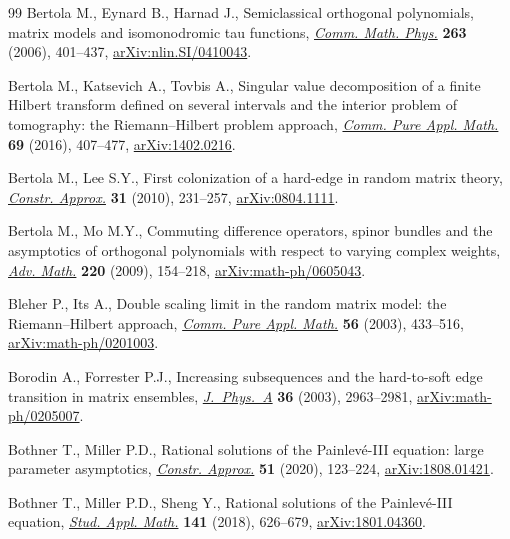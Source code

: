 \documentclass[10pt,a4paper]{amsart}
\numberwithin{equation}{section}
\theoremstyle{definition}
\begin{document}
\begin{thebibliography}{99}
Bertola M., Eynard B., Harnad J., Semiclassical orthogonal polynomials, matrix
 models and isomonodromic tau functions,
 \href{https://doi.org/10.1007/s00220-005-1505-4}{\textit{Comm. Math. Phys.}}
 \textbf{263} (2006), 401--437,
 \href{http://arxiv.org/abs/nlin.SI/0410043}{arXiv:nlin.SI/0410043}.

Bertola M., Katsevich A., Tovbis A., Singular value decomposition of a finite
 {H}ilbert transform defined on several intervals and the interior problem of
 tomography: the {R}iemann--{H}ilbert problem approach,
 \href{https://doi.org/10.1002/cpa.21547}{\textit{Comm. Pure Appl. Math.}}
 \textbf{69} (2016), 407--477,
 \href{http://arxiv.org/abs/1402.0216}{arXiv:1402.0216}.

Bertola M., Lee S.Y., First colonization of a hard-edge in random matrix
 theory, \href{https://doi.org/10.1007/s00365-009-9052-4}{\textit{Constr.
 Approx.}} \textbf{31} (2010), 231--257,
 \href{http://arxiv.org/abs/0804.1111}{arXiv:0804.1111}.

Bertola M., Mo M.Y., Commuting difference operators, spinor bundles and the
 asymptotics of orthogonal polynomials with respect to varying complex
 weights, \href{https://doi.org/10.1016/j.aim.2008.09.001}{\textit{Adv.
 Math.}} \textbf{220} (2009), 154--218,
 \href{http://arxiv.org/abs/math-ph/0605043}{arXiv:math-ph/0605043}.

Bleher P., Its A., Double scaling limit in the random matrix model: the
 {R}iemann--{H}ilbert approach,
 \href{https://doi.org/10.1002/cpa.10065}{\textit{Comm. Pure Appl. Math.}}
 \textbf{56} (2003), 433--516,
 \href{http://arxiv.org/abs/math-ph/0201003}{arXiv:math-ph/0201003}.

Borodin A., Forrester P.J., Increasing subsequences and the hard-to-soft edge
 transition in matrix ensembles,
 \href{https://doi.org/10.1088/0305-4470/36/12/307}{\textit{J.~Phys.~A}}
 \textbf{36} (2003), 2963--2981,
 \href{http://arxiv.org/abs/math-ph/0205007}{arXiv:math-ph/0205007}.

Bothner T., Miller P.D., Rational solutions of the {P}ainlev\'e-{III} equation:
 large parameter asymptotics,
 \href{https://doi.org/10.1007/s00365-019-09463-4}{\textit{Constr. Approx.}}
 \textbf{51} (2020), 123--224,
 \href{http://arxiv.org/abs/1808.01421}{arXiv:1808.01421}.

Bothner T., Miller P.D., Sheng Y., Rational solutions of the {P}ainlev\'e-{III}
 equation, \href{https://doi.org/10.1111/sapm.12220}{\textit{Stud. Appl.
 Math.}} \textbf{141} (2018), 626--679,
 \href{http://arxiv.org/abs/1801.04360}{arXiv:1801.04360}.


\end{thebibliography}
\end{document}
